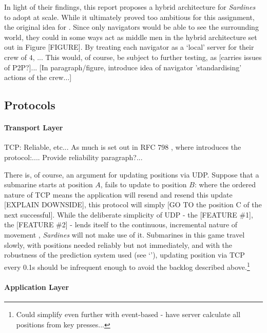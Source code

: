 \documentclass[a4paper, 10pt]{article}
\begin{document}
\begin{flushleft}
\vspace{5pt}\noindent
In light of their findings, this report proposes a hybrid architecture for \textit{Sardines} to adopt at scale. While it ultimately proved too ambitious for this assignment, the original idea for . Since only navigators would be able to see the surrounding world, they could in some ways act as middle men in the hybrid architecture set out in Figure [FIGURE]. By treating each navigator as a `local' server for their crew of $4$, ...
This would, of course, be subject to further testing, as [carries issues of P2P?]...
[In paragraph/figure, introduce idea of navigator 'standardising' actions of the crew...]

\vspace{5pt}

\subsection*{Protocols}

\paragraph{Transport Layer}

TCP: Reliable, etc...
As much is set out in RFC 798 \citeyearpar{rfc793}, where \citeauthor{rfc793} introduces the protocol:.... %
Provide reliability paragraph?...

\vspace{5pt}\noindent
There is, of course, an argument for updating positions via UDP. Suppose that a submarine starts at position $A$, fails to update to position $B$: where the ordered nature of TCP means the application will resend and resend this update [EXPLAIN DOWNSIDE], this protocol will simply [GO TO the position C of the next successful].  While the deliberate simplicity of UDP - the [FEATURE \#1], the [FEATURE \#2] - lends itself to the continuous, incremental nature of movement , \textit{Sardines} will not make use of it. Submarines in this game travel slowly, with positions needed reliably but not immediately, and with the robustness of the prediction system used (see `'), updating position via TCP every 0.1s should be infrequent enough to avoid the backlog described above.\footnote{Could simplify even further with event-based - have server calculate all positions from key presses...}

\paragraph{Application Layer} 


\end{flushleft}
\end{document}

